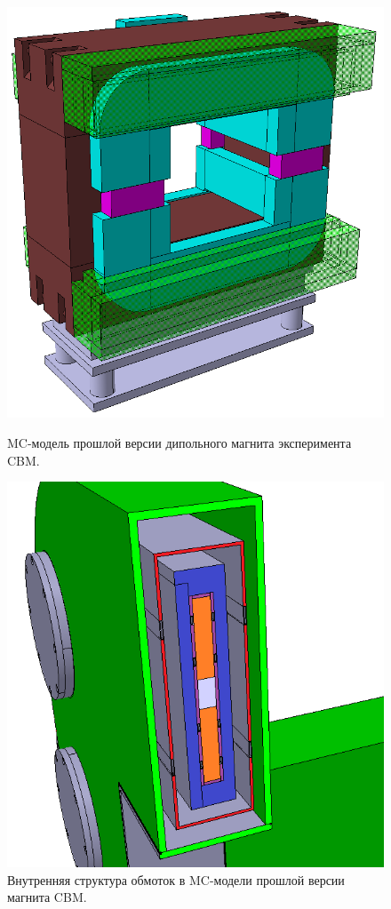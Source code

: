 \begin{figure}[H]
\begin{minipage}[b]{0.49\textwidth}
\includegraphics[width=1.0\textwidth]{pictures/Old_magnet_2.png}
\caption{MC-модель прошлой версии дипольного магнита эксперимента CBM.}
\label{fig:OldCbmMagnet1}
\end{minipage}
\hspace{0.01\textwidth}
\begin{minipage}[b]{0.49\textwidth}
\includegraphics[width=1.0\textwidth]{pictures/Old_magnet_coils.png}
\caption{Внутренняя структура обмоток в MC-модели прошлой версии магнита CBM.}
\label{fig:OldCbmMagnet2}
\end{minipage}
\end{figure}

